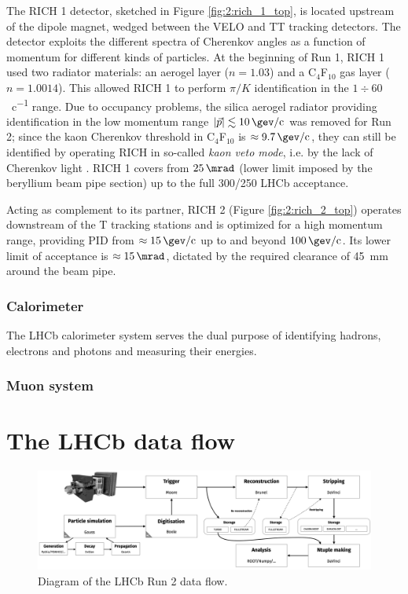 The RICH 1 detector, sketched in Figure \ref{fig:2:rich_1_top}, is located upstream of the dipole magnet, wedged between the VELO and TT tracking detectors.
The detector exploits the different spectra of Cherenkov angles as a function of momentum for different kinds of particles.
At the beginning of Run 1, RICH 1 used two radiator materials: an aerogel layer ($n=1.03$) and a C$_4$F$_{10}$ gas layer ($n=1.0014$).
This allowed RICH 1 to perform $\pi/K$ identification in the $1\div 60$ \si{\gev\per c} range.
Due to occupancy problems, the silica aerogel radiator providing identification in the low momentum range $|\vec{p}| \lesssim \SI{10}{\gev\per c}$ was removed for Run 2;
since the kaon Cherenkov threshold in C$_4$F$_{10}$ is $\approx \SI{9.7}{\gev\per c}$, they can still be identified by operating RICH in so-called \textit{kaon veto mode}, i.e. 
by the lack of Cherenkov light \cite{HistoryLHCb} \cite{RichPerformance}.
RICH 1 covers from $\SI{25}{\mrad}$ (lower limit imposed by the beryllium beam pipe section) up to the full 300/250 \si{\mrad} LHCb acceptance.

Acting as complement to its partner, RICH 2 (Figure \ref{fig:2:rich_2_top}) operates downstream of the T tracking stations and is optimized for a high momentum range, providing PID from $\approx \SI{15}{\gev\per c}$ up to and beyond $\SI{100}{\gev\per c}$.
Its lower limit of acceptance is $\approx \SI{15}{\mrad}$, dictated by the required clearance of \SI{45}{\milli\meter} around the beam pipe.

\subsubsection{Calorimeter}
The LHCb calorimeter system \cite{Amato:494264} serves the dual purpose of identifying hadrons, electrons and photons and measuring their energies.

\subsubsection{Muon system}

\section{The LHCb data flow}
\label{sec:2:data_flow}
\begin{figure}[t]
	\centering
	\includegraphics[width=\textwidth]{graphics/02-lhcb/lhcb_run_2_data_flow.png}
	\caption{Diagram of the LHCb Run 2 data flow.}
	\label{fig:2:lhcb_data_flow}
\end{figure}

